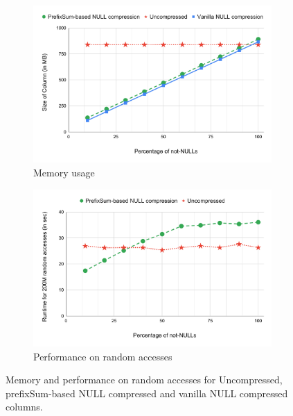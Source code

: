 \begin{figure}
	\hspace*{-25pt}
	\begin{subfigure}{0.55\textwidth}
		\centering
		\includegraphics[scale=0.30]{img/pref-space}
		\captionsetup{justification=centering}
		\caption{Memory usage}
		\label{fig:pref-space}
	\end{subfigure}
	\begin{subfigure}{0.55\textwidth}
		\centering
		\includegraphics[scale=0.30]{img/pref-perf}
		\captionsetup{justification=centering}
		\caption{Performance on random accesses}
		\label{fig:pref-perf}
	\end{subfigure}
	\captionsetup{justification=centering}
	\caption{Memory and performance on random accesses for Uncompressed, prefixSum-based NULL compressed and vanilla NULL compressed columns.}
	\label{fig:pref-stress}
\end{figure}

